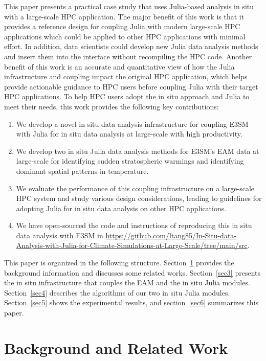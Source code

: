 \documentclass{juliacon}
\begin{document}
This paper presents a practical case study that uses Julia-based analysis in situ with a large-scale HPC application. The major benefit of this work is that it provides a reference design for coupling Julia with modern large-scale HPC applications which could be applied to other HPC applications with minimal effort.
In addition, data scientists could develop new Julia data analysis methods and insert them into the interface without recompiling the HPC code.
Another benefit of this work is an accurate and quantitative view of how the Julia infrastructure and coupling impact the original HPC application, which helps provide actionable guidance to HPC users before coupling Julia with their target HPC applications. To help HPC users adopt the in situ approach and Julia to meet their needs, this work provides the following key contributions:
\begin{enumerate}
\item We develop a novel in situ data analysis infrastructure for coupling E3SM with Julia for in situ data analysis at large-scale with high productivity.
\item We develop two in situ Julia data analysis methods for E3SM's EAM data at large-scale for identifying sudden stratospheric warmings and identifying dominant spatial patterns in temperature.
\item We evaluate the performance of this coupling infrastructure on a large-scale HPC system and study various design considerations, leading to guidelines for adopting Julia for in situ data analysis on other HPC applications.
\item We have open-sourced the code and instructions of reproducing this in situ data analysis with E3SM in \url{https://github.com/ltang85/In-Situ-data-Analysis-with-Julia-for-Climate-Simulations-at-Large-Scale/tree/main/src}.
\end{enumerate}


This paper is organized in the following structure. Section~\ref{sec2} provides the background information and discusses some related works. Section~\ref{sec3} presents the in situ infrastructure that couples the EAM and the in situ Julia modules. Section~\ref{sec4} describes the algorithms of our two in situ Julia modules. Section~\ref{sec5} shows the experimental results, and section~\ref{sec6} summarizes this paper.



\section{Background and Related Work} \label{sec2}
\end{document}
